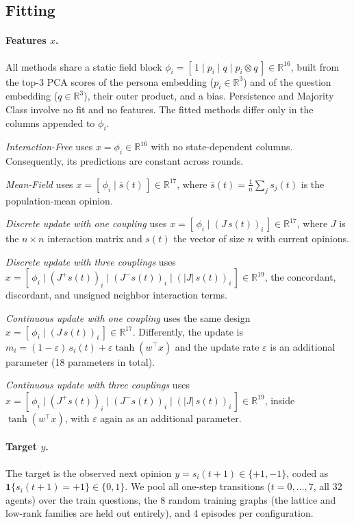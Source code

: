 \subsection{Fitting}\label{apdx:fitting}
\paragraph{Features $x$.} All methods share a static field block
$\phi_i = [\,1 \mid p_i \mid q \mid p_i \otimes q\,] \in \mathbb{R}^{16}$,
built from the top-3 PCA scores of the persona embedding ($p_i \in \mathbb{R}^{3}$)
and of the question embedding ($q \in \mathbb{R}^{3}$), their outer product, and a
bias. Persistence and Majority Class involve no fit and no features. The fitted
methods differ only in the columns appended to $\phi_i$.

\textit{Interaction-Free} uses $x = \phi_i \in \mathbb{R}^{16}$ with no
state-dependent columns. Consequently, its predictions are constant across rounds.

\textit{Mean-Field} uses $x = [\,\phi_i \mid \bar{s}(t)\,] \in \mathbb{R}^{17}$,
where $\bar{s}(t) = \frac{1}{n}\sum_j s_j(t)$ is the population-mean opinion.

\textit{Discrete update with one coupling} uses
$x = [\,\phi_i \mid (J \, s(t))_i\,] \in \mathbb{R}^{17}$, where $J$ is the
$n \times n$ interaction matrix and $s(t)$ the vector of size $n$ with current opinions.

\textit{Discrete update with three couplings} uses $x = [\,\phi_i \mid (J^{+} s(t))_i \mid (J^{-} s(t))_i \mid (|J|\, s(t))_i\,]
\in \mathbb{R}^{19}$, the concordant, discordant, and unsigned neighbor interaction terms. 

\textit{Continuous update with one coupling} uses the same design
$x = [\,\phi_i \mid (J \, s(t))_i\,] \in \mathbb{R}^{17}$. Differently, the update is
$m_i = (1-\varepsilon)\, s_i(t) + \varepsilon \tanh(w^{\top}x)$ and the
update rate $\varepsilon$ is an additional parameter (18 parameters in total).

\textit{Continuous update with three couplings} uses
$x = [\,\phi_i \mid (J^{+} s(t))_i \mid (J^{-} s(t))_i \mid (|J|\, s(t))_i\,]
\in \mathbb{R}^{19}$, inside $\tanh(w^{\top}x)$, with $\varepsilon$ again
as an additional parameter.

\paragraph{Target $y$.} The target is the observed next opinion
$y = s_i(t{+}1) \in \{+1,-1\}$, coded as
$\mathbf{1}\{s_i(t{+}1) = +1\} \in \{0,1\}$. We pool all one-step transitions ($t = 0,\dots,7$, all 32 agents) over the train questions, the 8 random training graphs (the lattice and low-rank families are held out entirely), and 4 episodes per configuration.


